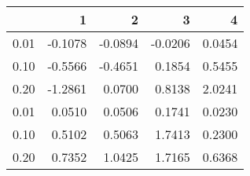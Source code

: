 \begin{tabular}{lrrrr}
\toprule
{} &       1 &       2 &       3 &       4 \\
\midrule
0.01 & -0.1078 & -0.0894 & -0.0206 &  0.0454 \\
0.10 & -0.5566 & -0.4651 &  0.1854 &  0.5455 \\
0.20 & -1.2861 &  0.0700 &  0.8138 &  2.0241 \\
0.01 &  0.0510 &  0.0506 &  0.1741 &  0.0230 \\
0.10 &  0.5102 &  0.5063 &  1.7413 &  0.2300 \\
0.20 &  0.7352 &  1.0425 &  1.7165 &  0.6368 \\
\bottomrule
\end{tabular}
